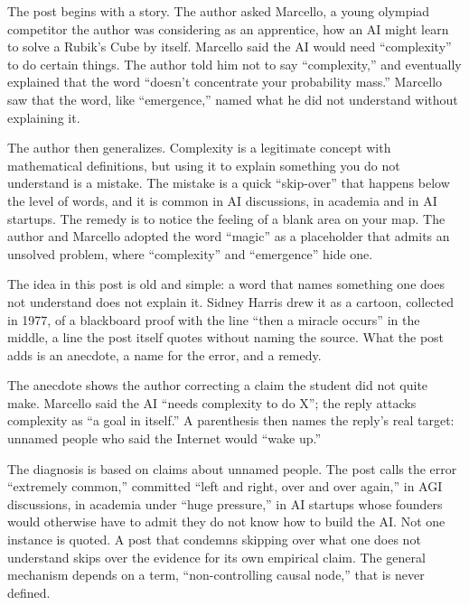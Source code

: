 \begin{afterword}
\summaryhead

The post begins with a story. The author asked Marcello, a young olympiad competitor the author was considering as an apprentice, how an AI might learn to solve a Rubik's Cube by itself. Marcello said the AI would need ``complexity'' to do certain things. The author told him not to say ``complexity,'' and eventually explained that the word ``doesn't concentrate your probability mass.'' Marcello saw that the word, like ``emergence,'' named what he did not understand without explaining it.

The author then generalizes. Complexity is a legitimate concept with mathematical definitions, but using it to explain something you do not understand is a mistake. The mistake is a quick ``skip-over'' that happens below the level of words, and it is common in AI discussions, in academia and in AI startups. The remedy is to notice the feeling of a blank area on your map. The author and Marcello adopted the word ``magic'' as a placeholder that admits an unsolved problem, where ``complexity'' and ``emergence'' hide one.

\responsehead

The idea in this post is old and simple: a word that names something one does not understand does not explain it. Sidney Harris drew it as a cartoon, collected in 1977, of a blackboard proof with the line ``then a miracle occurs'' in the middle, a line the post itself quotes without naming the source. What the post adds is an anecdote, a name for the error, and a remedy.

The anecdote shows the author correcting a claim the student did not quite make. Marcello said the AI ``needs complexity to do X''; the reply attacks complexity as ``a goal in itself.'' A parenthesis then names the reply's real target: unnamed people who said the Internet would ``wake up.''

The diagnosis is based on claims about unnamed people. The post calls the error ``extremely common,'' committed ``left and right, over and over again,'' in AGI discussions, in academia under ``huge pressure,'' in AI startups whose founders would otherwise have to admit they do not know how to build the AI. Not one instance is quoted. A post that condemns skipping over what one does not understand skips over the evidence for its own empirical claim. The general mechanism depends on a term, ``non-controlling causal node,'' that is never defined.


\end{afterword}
